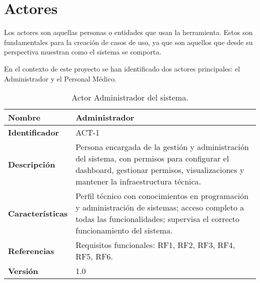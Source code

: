 \section{Actores}

Los actores son aquellas personas o entidades que usan la herramienta. Estos son fundamentales para la creación de casos de uso, ya que son aquellos que desde su perspectiva muestran como el sistema se comporta. 

En el contexto de este proyecto se han identificado dos actores principales: el Administrador y el Personal Médico. 

\begin{table}[H]
    \centering
    \begin{tabular}{|l|p{11cm}|}
        \hline
        \textbf{Nombre} & Administrador \\
        \hline
        \textbf{Identificador} & ACT-1 \\
        \hline
        \textbf{Descripción} & Persona encargada de la gestión y administración del sistema, con permisos para configurar el dashboard, gestionar permisos, visualizaciones y mantener la infraestructura técnica. \\
        \hline
        \textbf{Características} & Perfil técnico con conocimientos en programación y administración de sistemas; acceso completo a todas las funcionalidades; supervisa el correcto funcionamiento del sistema. \\
        \hline
        \textbf{Referencias} & Requisitos funcionales: RF1, RF2, RF3, RF4, RF5, RF6. \\
        \hline
        \textbf{Versión} & 1.0 \\
        \hline
    \end{tabular}
    \caption{Actor Administrador del sistema.}
\end{table}

